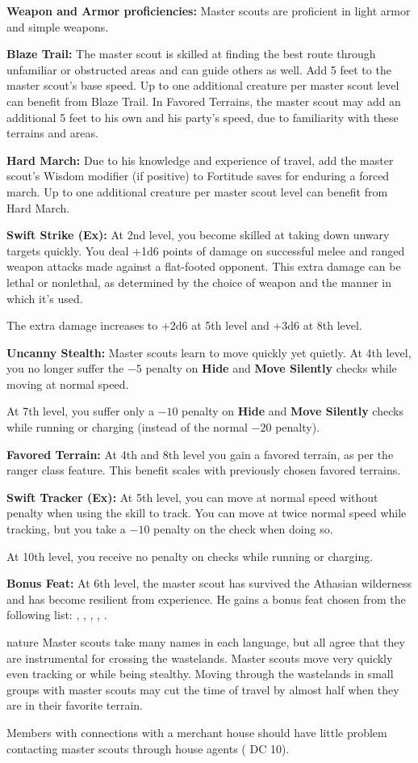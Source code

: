 {
\textbf{Weapon and Armor proficiencies:} Master scouts are proficient in light armor and simple weapons.

\textbf{Blaze Trail:} The master scout is skilled at finding the best route through unfamiliar or obstructed areas and can guide others as well. Add 5 feet to the master scout's base speed. Up to one additional creature per master scout level can benefit from Blaze Trail. In Favored Terrains, the master scout may add an additional 5 feet to his own and his party's speed, due to familiarity with these terrains and areas.

\textbf{Hard March:} Due to his knowledge and experience of travel, add the master scout's Wisdom modifier (if positive) to Fortitude saves for enduring a forced march. Up to one additional creature per master scout level can benefit from Hard March.

\textbf{Swift Strike (Ex):} At 2nd level, you become skilled at taking down unwary targets quickly. You deal +1d6 points of damage on successful melee and ranged weapon attacks made against a flat-footed opponent. This extra damage can be lethal or nonlethal, as determined by the choice of weapon and the manner in which it's used.

The extra damage increases to +2d6 at 5th level and +3d6 at 8th level.

\textbf{Uncanny Stealth:} Master scouts learn to move quickly yet quietly. At 4th level, you no longer suffer the $-5$ penalty on \textbf{Hide} and \textbf{Move Silently} checks while moving at normal speed.

At 7th level, you suffer only a $-10$ penalty on \textbf{Hide} and \textbf{Move Silently} checks while running or charging (instead of the normal $-20$ penalty).

\textbf{Favored Terrain:} At 4th and 8th level you gain a favored terrain, as per the ranger class feature. This benefit scales with previously chosen favored terrains.

\textbf{Swift Tracker (Ex):} At 5th level, you can move at normal speed without penalty when using the  skill to track. You can move at twice normal speed while tracking, but you take a $-10$ penalty on the check when doing so.

At 10th level, you receive no penalty on  checks while running or charging.

\textbf{Bonus Feat:} At 6th level, the master scout has survived the Athasian wilderness and has become resilient from experience. He gains a bonus feat chosen from the following list: , , , , .
}
{}
{nature}
{Master scouts take many names in each language, but all agree that they are instrumental for crossing the wastelands.}
{Master scouts move very quickly even tracking or while being stealthy.}
{Moving through the wastelands in small groups with master scouts may cut the time of travel by almost half when they are in their favorite terrain.}

Members with connections with a merchant house should have little problem contacting master scouts through house agents ( DC 10).